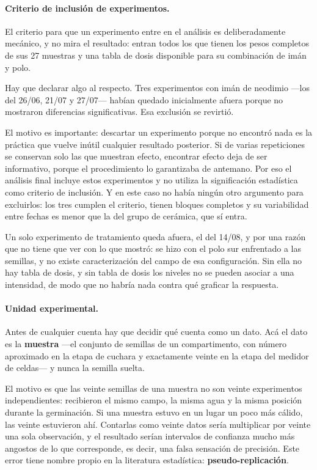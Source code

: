 \paragraph{Criterio de inclusión de experimentos.}

El criterio para que un experimento entre en el análisis es deliberadamente mecánico, y no mira el resultado: entran todos los que tienen los pesos completos de sus 27 muestras y una tabla de dosis disponible para su combinación de imán y polo.

Hay que declarar algo al respecto. Tres experimentos con imán de neodimio ---los del 26/06, 21/07 y 27/07--- habían quedado inicialmente afuera porque no mostraron diferencias significativas. Esa exclusión se revirtió.

El motivo es importante: descartar un experimento porque no encontró nada es la práctica que vuelve inútil cualquier resultado posterior. Si de varias repeticiones se conservan solo las que muestran efecto, encontrar efecto deja de ser informativo, porque el procedimiento lo garantizaba de antemano. Por eso el análisis final incluye estos experimentos y no utiliza la significación estadística como criterio de inclusión. Y en este caso no había ningún otro argumento para excluirlos: los tres cumplen el criterio, tienen bloques completos y su variabilidad entre fechas es menor que la del grupo de cerámica, que sí entra.

Un solo experimento de tratamiento queda afuera, el del 14/08, y por una razón que no tiene que ver con lo que mostró: se hizo con el polo sur enfrentado a las semillas, y no existe caracterización del campo de esa configuración. Sin ella no hay tabla de dosis, y sin tabla de dosis los niveles no se pueden asociar a una intensidad, de modo que no habría nada contra qué graficar la respuesta.

\paragraph{Unidad experimental.}

Antes de cualquier cuenta hay que decidir qué cuenta como un dato. Acá el dato es la \textbf{muestra} ---el conjunto de semillas de un compartimento, con número aproximado en la etapa de cuchara y exactamente veinte en la etapa del medidor de celdas--- y nunca la semilla suelta.

El motivo es que las veinte semillas de una muestra no son veinte experimentos independientes: recibieron el mismo campo, la misma agua y la misma posición durante la germinación. Si una muestra estuvo en un lugar un poco más cálido, las veinte estuvieron ahí. Contarlas como veinte datos sería multiplicar por veinte una sola observación, y el resultado serían intervalos de confianza mucho más angostos de lo que corresponde, es decir, una falsa sensación de precisión. Este error tiene nombre propio en la literatura estadística: \textbf{pseudo-replicación}.


